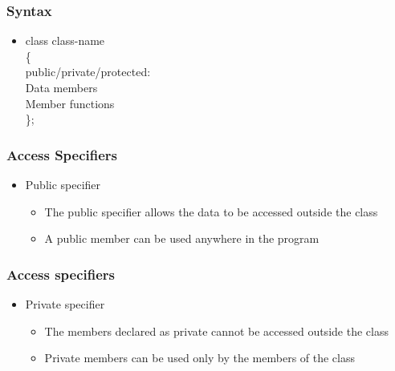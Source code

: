 \documentclass[17pt]{beamer}
\begin{document}
 
  \begin{frame}
  \frametitle{Syntax}\pause
    \begin{itemize}
    \item  class class-name \vspace{.20cm}
  \\ \{ \vspace{.20cm}
  \\  public/private/protected: \vspace{.20cm}
  \\  Data members  \vspace{.20cm} 
  \\ Member functions \vspace{.20cm} 
  \\  \};
  \end{itemize}
\end{frame}

\begin{frame}
\frametitle{Access Specifiers}
\begin{itemize}[<+-|alert@+>]
\item Public specifier \vspace{.30cm}
\begin{itemize}
\item The public specifier allows the data to be accessed outside the class \vspace{.30cm}
\item A public member can be used anywhere in the program 
\end{itemize}
\end{itemize}
\end{frame}


\begin{frame}
\frametitle{Access specifiers}
\begin{itemize}[<+-|alert@+>]
\item Private specifier \vspace{.30cm}
\begin{itemize}
\item The members declared as private cannot be accessed outside the class \vspace{.30cm}
\item Private members can be used only by the members of the class \vspace{.30cm}

\end{itemize}
\end{itemize}
\end{frame}
\end{document}
